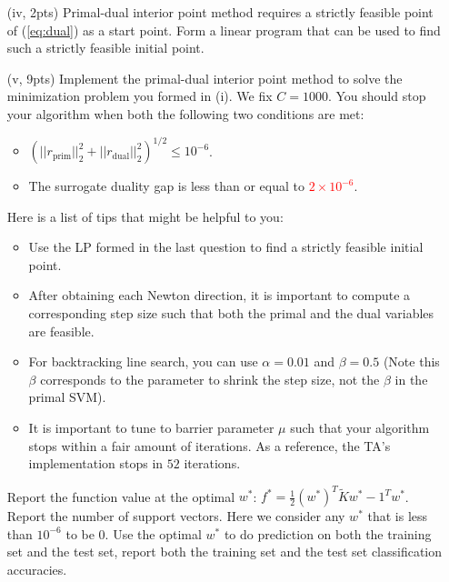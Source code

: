 \documentclass{article}
\theoremstyle{remark}
\theoremstyle{definition}
\begin{document}
\begin{enumerate}[(a)]
\begin{enumerate}[(i)]
\item[(iv, 2pts)]   Primal-dual interior point method requires a strictly feasible point of (\ref{eq:dual}) as a start point. Form a linear program that can be used to find such a strictly feasible initial point. 
\item[(v, 9pts)]   Implement the primal-dual interior point method to solve the minimization problem you formed in (i). We fix $C = 1000$. You should stop your algorithm when both the following two conditions are met:
    \begin{itemize}
      \item   $(||r_{\text{prim}}||_2^2 + ||r_{\text{dual}}||_2^2)^{1/2}\leq 10^{-6}$.
      \item   The surrogate duality gap is less than or equal to \textcolor{red}{$2\times 10^{-6}$}.
    \end{itemize}
  Here is a list of tips that might be helpful to you:
  \begin{itemize}
      \item   Use the LP formed in the last question to find a strictly feasible initial point.
      \item   After obtaining each Newton direction, it is important to compute a corresponding step size such that both the primal and the dual variables are feasible. 
      \item   For backtracking line search, you can use $\alpha = 0.01$ and $\beta = 0.5$ (Note this $\beta$ corresponds to the parameter to shrink the step size, not the $\beta$ in the primal SVM).
      \item   It is important to tune to barrier parameter $\mu$ such that your algorithm stops within a fair amount of iterations. As a reference, the TA's implementation stops in $52$ iterations.
  \end{itemize}
  Report the function value at the optimal $w^*$: $f^* = \frac{1}{2}(w^*)^T\tilde{K}w^* - 1^Tw^*$. Report the number of support vectors. Here we consider any $w^*$ that is less than $10^{-6}$ to be 0. Use the optimal $w^*$ to do prediction on both the training set and the test set, report both the training set and the test set classification accuracies. 
  \end{enumerate}

\end{enumerate}
\end{document}
